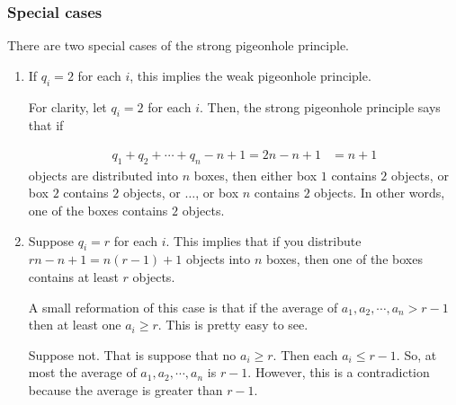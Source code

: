 \documentclass{report}
\begin{document}
\subsubsection*{Special cases}

There are two special cases of the strong pigeonhole principle.

\begin{enumerate}
    \item If $q_i=2$ for each $i$, this implies the weak pigeonhole principle.

          For clarity, let $q_i=2$ for each $i$. Then, the strong pigeonhole
          principle says that if

          \begin{align*}
              q_1 + q_2 + \cdots + q_n - n + 1 = 2n - n + 1
               & = n + 1
          \end{align*}
          objects are distributed into $n$ boxes, then either box $1$ contains
          $2$ objects, or box $2$ contains $2$ objects, or $\dots$, or box $n$
          contains $2$ objects. In other words, one of the boxes contains $2$
          objects.

    \item Suppose $q_i=r$ for each $i$. This implies that if you distribute
          $rn - n + 1 = n(r-1)+1$ objects into $n$ boxes, then one of the boxes
          contains at least $r$ objects.

          A small reformation of this case is that if the average of
          $a_1, a_2, \cdots, a_n > r-1$ then at least one $a_i \ge r$. This is
          pretty easy to see.

          \begin{subproof}
              Suppose not. That is suppose that no $a_i \ge r$. Then each
              $a_i \le r-1$. So, at most the average of $a_1, a_2, \cdots, a_n$
              is $r-1$. However, this is a contradiction because the average
              is greater than $r-1$.
          \end{subproof}
\end{enumerate}

\end{document}
